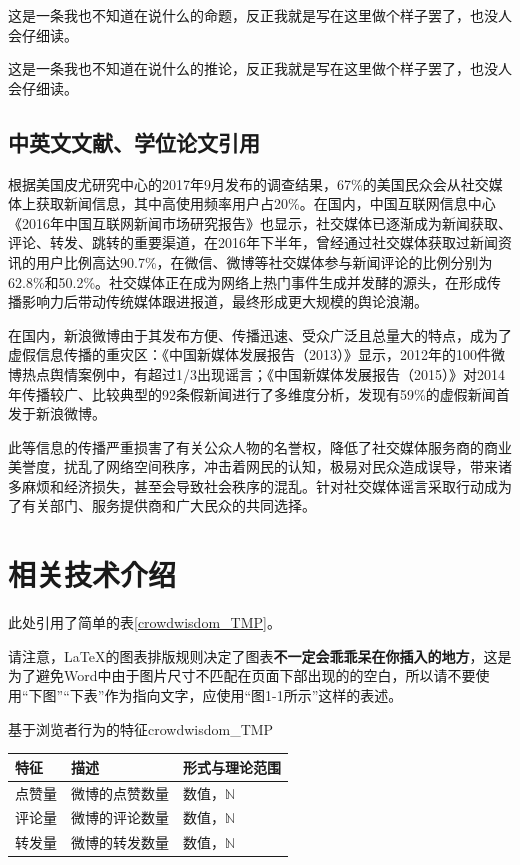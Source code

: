 \documentclass[a4paper,AutoFakeBold,oneside,12pt]{book}
\begin{document}
\begin{proposition}
	这是一条我也不知道在说什么的命题，反正我就是写在这里做个样子罢了，也没人会仔细读。
\end{proposition}

\begin{corollary}
	这是一条我也不知道在说什么的推论，反正我就是写在这里做个样子罢了，也没人会仔细读。
\end{corollary}

\subsection{中英文文献、学位论文引用}
根据美国皮尤研究中心的2017年9月发布的调查结果\cite{pew_news_use_2017}，67\%的美国民众会从社交媒体上获取新闻信息，其中高使用频率用户占20\%。在国内，中国互联网信息中心《2016年中国互联网新闻市场研究报告》\cite{internet_news_2016}也显示，社交媒体已逐渐成为新闻获取、评论、转发、跳转的重要渠道，在2016年下半年，曾经通过社交媒体获取过新闻资讯的用户比例高达90.7\%，在微信、微博等社交媒体参与新闻评论的比例分别为62.8\%和50.2\%。社交媒体正在成为网络上热门事件生成并发酵的源头，在形成传播影响力后带动传统媒体跟进报道，最终形成更大规模的舆论浪潮。\cite{Yang2012Automatic}

在国内，新浪微博由于其发布方便、传播迅速、受众广泛且总量大的特点，成为了虚假信息传播的重灾区：《中国新媒体发展报告（2013）》\cite{唐绪军2013中国新媒体发展报告}显示，2012年的100件微博热点舆情案例中，有超过1/3出现谣言；《中国新媒体发展报告（2015）》\cite{唐绪军2015中国新媒体发展报告}对2014年传播较广、比较典型的92条假新闻进行了多维度分析，发现有59\%的虚假新闻首发于新浪微博。

此等信息的传播严重损害了有关公众人物的名誉权，降低了社交媒体服务商的商业美誉度，扰乱了网络空间秩序，冲击着网民的认知，极易对民众造成误导，带来诸多麻烦和经济损失，甚至会导致社会秩序的混乱。针对社交媒体谣言采取行动成为了有关部门、服务提供商和广大民众的共同选择。\cite{周兴2017基于深度学习的谣言检测及模式挖掘}

\section{相关技术介绍}
此处引用了简单的表\ref{crowdwisdom_TMP}。

请注意，\LaTeX{}的图表排版规则决定了图表\textbf{不一定会乖乖呆在你插入的地方}，这是为了避免Word中由于图片尺寸不匹配在页面下部出现的的空白，所以请不要使用“下图”“下表”作为指向文字，应使用“图1-1所示”这样的表述。

\begin{bupttable}{基于浏览者行为的特征}{crowdwisdom_TMP}

	\begin{tabular}{l|l|l}
		\hline \textbf{特征} & \textbf{描述}  & \textbf{形式与理论范围} \\
		\hline 点赞量        & 微博的点赞数量 & 数值，$\mathbb{N}$      \\
		\hline 评论量        & 微博的评论数量 & 数值，$\mathbb{N}$      \\
		\hline 转发量        & 微博的转发数量 & 数值，$\mathbb{N}$      \\
		\hline
	\end{tabular}
\end{bupttable}
\end{document}
